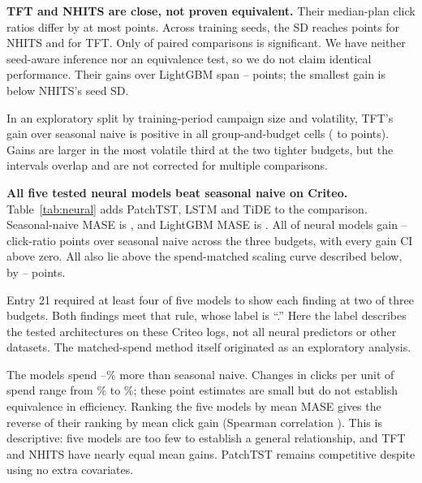 \documentclass[sigconf,nonacm]{acmart}
\begin{document}
\textbf{TFT and NHITS are close, not proven equivalent.} Their median-plan
click ratios differ by at most  points. Across training
seeds, the SD reaches  points for NHITS and
 for TFT. Only  of
 paired comparisons is significant. We have neither
seed-aware inference nor an equivalence test, so we do not claim identical
performance. Their gains over LightGBM span --
points; the smallest gain is below NHITS's seed SD.

In an exploratory split by training-period campaign size and volatility, TFT's
gain over seasonal naive is positive in all  group-and-budget
cells ( to  points). Gains are larger in
the most volatile third at the two tighter budgets, but the intervals overlap
and are not corrected for multiple comparisons.

\begin{table}[tb]
  \caption{Five-model extension. MASE averages campaigns and training seeds. Click gains and distances above the spend-matched naive curve are in reference-click points.}
  \label{tab:neural}
  \small\setlength{\tabcolsep}{3pt}
  \resizebox{\linewidth}{!}{}
\end{table}

\textbf{All five tested neural models beat seasonal naive on Criteo.}
Table~\ref{tab:neural} adds PatchTST, LSTM and TiDE to the comparison.
Seasonal-naive MASE is , and LightGBM MASE is
. All  of  neural
models gain -- click-ratio points over
seasonal naive across the three budgets, with every gain CI above zero.
All  also lie above the spend-matched scaling curve described
below, by -- points.

Entry 21 required at least four of five models to show each finding at two of
three budgets. Both findings meet that rule, whose label is
``.'' Here the label describes the tested architectures
on these Criteo logs, not all neural predictors or other datasets. The
matched-spend method itself originated as an exploratory analysis.

The models spend --\% more than seasonal
naive. Changes in clicks per unit of spend range from \% to
\%; these point estimates are small but do not establish
equivalence in efficiency. Ranking the five models by mean MASE gives the
reverse of their ranking by mean click gain (Spearman correlation
). This is descriptive: five models are too few to establish
a general relationship, and TFT and NHITS have nearly equal mean gains.
PatchTST remains competitive despite using no extra covariates.
\end{document}
